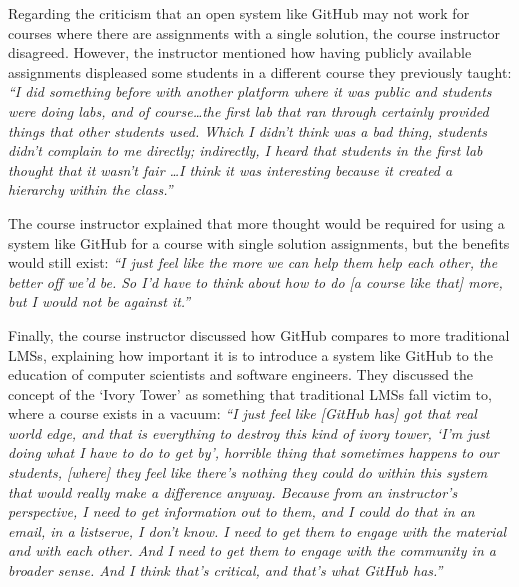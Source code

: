 Regarding the criticism that an open system like GitHub may not work for courses where there are assignments with a single solution, the course instructor disagreed. However, the instructor mentioned how having publicly available assignments displeased some students in a different course they previously taught: \textit{``I did something before with another platform where it was public and students were doing labs, and of course\ldots the first lab that ran through certainly provided things that other students used. Which I didn't think was a bad thing, students didn't complain to me directly; indirectly, I heard that students in the first lab thought that it wasn't fair \ldots I think it was interesting because it created a hierarchy within the class.''}

The course instructor explained that more thought would be required for using a system like GitHub for a course with single solution assignments, but the benefits would still exist: \textit{``I just feel like the more we can help them help each other, the better off we'd be. So I'd have to think about how to do [a course like that] more, but I would not be against it.''}

Finally, the course instructor discussed how GitHub compares to more traditional LMSs, explaining how important it is to introduce a system like GitHub to the education of computer scientists and software engineers. They discussed the concept of the `Ivory Tower' as something that traditional LMSs fall victim to, where a course exists in a vacuum: \textit{``I just feel like [GitHub has] got that real world edge, and that is everything to destroy this kind of ivory tower, `I'm just doing what I have to do to get by', horrible thing that sometimes happens to our students, [where] they feel like there's nothing they could do within this system that would really make a difference anyway. Because from an instructor's perspective, I need to get information out to them, and I could do that in an email, in a listserve, I don't know. I need to get them to engage with the material and with each other. And I need to get them to engage with the community in a broader sense. And I think that's critical, and that's what GitHub has.''}




